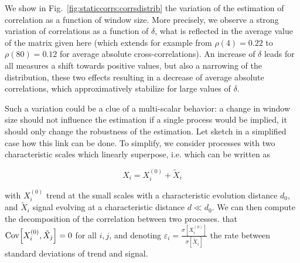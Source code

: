 We show in Fig.~\ref{fig:staticcorrs:corrsdistrib} the variation of the estimation of correlation as a function of window size. More precisely, we observe a strong variation of correlations as a function of $\delta$, what is reflected in the average value of the matrix given here (which extends for example from $\rho(4)=0.22$ to $\rho(80)=0.12$ for average absolute cross-correlations). An increase of $\delta$ leads for all measures a shift towards positive values, but also a narrowing of the distribution, these two effects resulting in a decrease of average absolute correlations, which approximatively stabilize for large values of $\delta$.

Such a variation could be a clue of a multi-scalar behavior: a change in window size should not influence the estimation if a single process would be implied, it should only change the robustness of the estimation. Let sketch in a simplified case how this link can be done. To simplify, we consider processes with two characteristic scales which linearly superpose, i.e. which can be written as

\begin{equation}
X_i = X_i^{(0)} + \tilde{X}_i
\end{equation}

with $X_i^{(0)}$ trend at the small scales with a characteristic evolution distance $d_0$, and $\tilde{X}_i$ signal evolving at a characteristic distance $d \ll d_0$. We can then compute the decomposition of the correlation between two processes.  that $\operatorname{Cov}\!\left[X_i^{(0)},\tilde{X}_j\right] = 0$ for all $i,j$, and denoting $\varepsilon_i = \frac{\sigma\left[X_i^{(0)}\right]}{\sigma\left[\tilde{X}_i\right]}$ the rate between standard deviations of trend and signal. 


